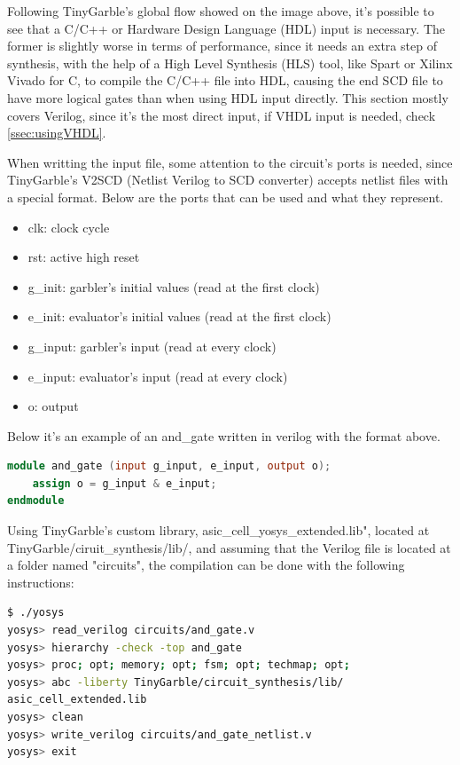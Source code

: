 \begin{refsection}
Following TinyGarble's global flow showed on the image above, it's possible to see that a C/C++ or Hardware Design Language (HDL) input is necessary. The former is slightly worse in terms of performance, since it needs an extra step of synthesis, with the help of a High Level Synthesis (HLS) tool, like Spart or Xilinx Vivado for C, to compile the C/C++ file into HDL, causing the end SCD file to have more logical gates than when using HDL input directly. This section mostly covers Verilog, since it's the most direct input, if VHDL input is needed, check \ref{ssec:usingVHDL}.

When writting the input file, some attention to the circuit's ports is needed, since TinyGarble's V2SCD (Netlist Verilog to SCD converter) accepts netlist files with a special format.
Below are the ports that can be used and what they represent.

\begin{itemize}
\item clk: clock cycle
\item rst: active high reset
\item g\_init: garbler's initial values (read at the first clock)
\item e\_init: evaluator's initial values (read at the first clock)
\item g\_input: garbler's input (read at every clock)
\item e\_input: evaluator's input (read at every clock)
\item o: output
\end{itemize}

Below it's an example of an and\_gate written in verilog with the format above.

\begin{lstlisting}[caption={and\_gate.v}, language=Verilog, captionpos=b]
module and_gate (input g_input, e_input, output o);
	assign o = g_input & e_input;
endmodule
\end{lstlisting}

Using TinyGarble's custom library, asic\_cell\_yosys\_extended.lib", located at TinyGarble/ciruit\_synthesis/lib/, and assuming that the Verilog file is located at a folder named "circuits", the compilation can be done with the following instructions:

\begin{lstlisting}[caption={Yosys instructions to compile the HDL file to a Netlist file}, language=bash, captionpos=b]
$ ./yosys
yosys> read_verilog circuits/and_gate.v
yosys> hierarchy -check -top and_gate
yosys> proc; opt; memory; opt; fsm; opt; techmap; opt;
yosys> abc -liberty TinyGarble/circuit_synthesis/lib/
asic_cell_extended.lib
yosys> clean
yosys> write_verilog circuits/and_gate_netlist.v
yosys> exit					
\end{lstlisting}


\end{refsection}
